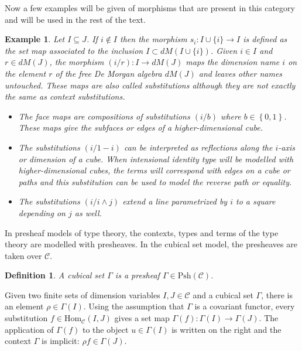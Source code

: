 \documentclass[12pt,a4paper,twoside,xetex]{book}
\newcommand{\keyword}[1]{\emph{#1}\index{#1}}
\newtheorem{definition}[theorem]{Definition}
\newtheorem{example}[theorem]{Example}
\newcommand{\Psh}[1]{\text{Psh}\left(#1\right)}
\newcommand{\homo}[3]{\text{Hom}_{#1}\left(#2,#3\right)}
\begin{document}
Now a few examples will be given of morphisms that are present in this category 
and will be used in the rest of the text.

\begin{example}
Let $I \subseteq J$. If $i \not \in I$ then the morphism $s_i : I \cup \{i\} 
\rightarrow I$ is defined as the set map associated to the inclusion $I \subset 
dM(I\cup \{i \})$.  Given $i \in I$ and $r \in dM(J)$, the morphism $(i/r): I 
\rightarrow dM(J) $ maps the dimension name $i$ on the element $r$ of the free 
De Morgan algebra $dM(J)$ and leaves other names untouched. These maps are also 
called \keyword{substitutions} although they are not exactly the same as 
context substitutions. 
\begin{itemize}
\item The \keyword{face maps} are compositions of substitutions $(i/b)$ where 
$b\in \left\{0,1\right\}$. These maps give the subfaces or edges of a 
higher-dimensional cube.
\item The substitutions $(i / 1- i)$ can be interpreted as reflections along 
the $i$-axis or dimension of a cube. When intensional 
identity type will be modelled with higher-dimensional cubes, the terms will 
correspond with edges on a cube or paths and this substitution can be used to 
model the reverse path or equality.
\item The substitutions $(i / i \wedge j)$ extend a line parametrized by $i$ to 
a square depending on $j$ as well.
\end{itemize}

\end{example}

In presheaf models of type theory, the contexts, types and terms of the type 
theory are modelled with presheaves. In the cubical set model, the presheaves 
are taken over $\mathcal{C}$.

\begin{definition}\label{cubset}
A \keyword{cubical set} $\Gamma$ is a presheaf $\Gamma \in \Psh{\mathcal{C}}$.
\end{definition}

Given two finite sets of dimension variables $I,J \in \mathcal{C}$ and a 
cubical set $\Gamma$,
there is an element $\rho \in \Gamma (I)$. Using the assumption that $\Gamma$ 
is a covariant functor, every substitution $f \in \homo{\mathcal{C}}{I}{J}$ 
gives a set map $\Gamma (f) : \Gamma (I) \rightarrow \Gamma (J)$. 
The application of $\Gamma(f)$ to the object $u \in \Gamma (I)$ is written on 
the right and the context $\Gamma$ is implicit: $\rho f \in \Gamma(J)$. 
\end{document}
